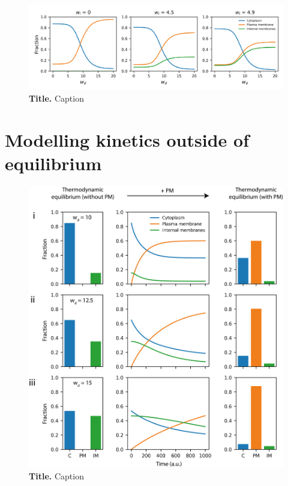 \documentclass[12pt]{"report"}
\newcommand{\mycaption}[2]{\caption[#1]{\textbf{#1.} #2}}
\begin{document}
\begin{figure}[!h]
\includegraphics[scale=0.90]{six_species_thermodynamic}
\setlength{\abovecaptionskip}{20pt}
\centering
\mycaption{Title}{Caption}
\label{fig:six_species_thermodynamic}
\end{figure}



\section{Modelling kinetics outside of equilibrium}


\begin{figure}[!h]
\includegraphics[scale=0.95]{three_surface_kinetic}
\setlength{\abovecaptionskip}{20pt}
\centering
\mycaption{Title}{Caption}
\label{fig:three_surface_kinetic}
\end{figure}
\end{document}
